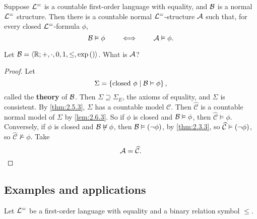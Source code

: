 \begin{theorem}
\label{thm:2.6.6}
Suppose $ \LL^= $ is a countable first-order language with equality, and $ \BB $ is a normal $ \LL^= $ structure. Then there is a countable normal $ \LL^= $-structure $ \AA $ such that, for every closed $ \LL^= $-formula $ \phi $,
$$ \BB \vDash \phi \qquad \iff \qquad \AA \vDash \phi. $$
\end{theorem}

\begin{example2}
Let $ \BB = \ab{\R; +, \cdot, 0, 1, \le, \exp\rb{}} $. What is $ \AA $?
\end{example2}

\begin{proof}
Let
$$ \Sigma = \cb{\text{closed} \ \phi \mid \BB \vDash \phi}, $$
called the \textbf{theory} of $ \BB $. Then $ \Sigma \supseteq \Sigma_E $, the axioms of equality, and $ \Sigma $ is consistent. By \ref{thm:2.5.3}, $ \Sigma $ has a countable model $ \mathcal{C} $. Then $ \widehat{\mathcal{C}} $ is a countable normal model of $ \Sigma $ by \ref{lem:2.6.3}. So if $ \phi $ is closed and $ \BB \vDash \phi $, then $ \widehat{\mathcal{C}} \vDash \phi $. Conversely, if $ \phi $ is closed and $ \BB \not\vDash \phi $, then $ \BB \vDash \notb{\phi} $, by \ref{thm:2.3.3}, so $ \widehat{\mathcal{C}} \vDash \notb{\phi} $, so $ \widehat{\mathcal{C}} \not\vDash \phi $. Take
$$ \AA = \widehat{\mathcal{C}}. $$
\end{proof}

\subsection{Examples and applications}

Let $ \LL^= $ be a first-order language with equality and a binary relation symbol $ \le $.

